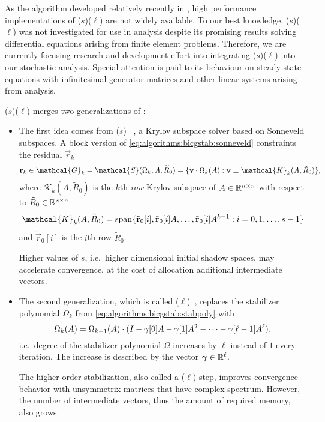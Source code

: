 As the algorithm developed relatively recently in
\citeyear{sleijpen2010exploiting}, high performance implementations of
($s$)($\ell$) are not widely available. To
our best knowledge, ($s$)($\ell$) was not
investigated for use in  analysis despite its promising
results solving differential equations arising from finite element
problems. Therefore, we are currently focusing research and
development effort into integrating
($s$)($\ell$) into our stochastic analysis.
Special attention is paid to its behaviour on steady-state equations
with infinitesimal generator matrices and other linear systems arising
from  analysis.

($s$)($\ell$) merges two generalizations of
:

\begin{itemize}
\item The first idea comes from ($s$)%
  ~\citep{sonneveld2008idr}, a Krylov subspace solver based on
  Sonneveld subspaces. A block version of
  \cref{eq:algorithms:bicgstab:sonneveld} constraints the residual
  $\vec{r}_k$
  \begin{equation}
    \vec{r}_k \in \mathcal{G}_k = \mathcal{S}(\Omega_k, A, \widetilde{R}_0) =
    \{ \vec{v} \cdot \Omega_k(A) : \vec{v} \perp \mathcal{K}_k(A,
    \tilde{R}_0) \}\text,
  \end{equation}
  where $\mathcal{K}_k(A, \tilde{R}_0)$ is the $k$th \emph{row} Krylov
  subspace of $A \in \mathbb{R}^{n \times n}$ with respect to
  $\tilde{R}_0 \in \mathbb{R}^{s \times n}$
  \begin{equation}
    \mathcal{K}_k(A, \widetilde{R}_0) = \Span \{ \tilde{\vec{r}}_0[i],
    \tilde{\vec{r}}_0[i] A, \ldots, \tilde{\vec{r}}_0[i] A^{k - 1} : i =
    0, 1, \ldots, s - 1 \}
  \end{equation}
  and $\tilde{\vec{r}}_0[i]$ is the $i$th row $\tilde{R}_0$.

  Higher values of $s$, i.e.~higher dimensional initial shadow spaces,
  may accelerate convergence, at the cost of allocation additional
  intermediate vectors.

\item The second generalization, which is called
  ($\ell$)~\citep{sleijpen1993bicgstab}, replaces the
  stabilizer polynomial $\Omega_k$ from
  \cref{eq:algorithms:bicgstab:stabpoly} with
  \begin{equation}
    \Omega_k(A) = \Omega_{k - 1}(A) \cdot (I - \gamma[0] A - \gamma[1] A^2
    - \cdots - \gamma[\ell - 1] A^{\ell}) \text,
  \end{equation}
  i.e.~degree of the stabilizer polynomial $\Omega$ increases by $\ell$
  instead of $1$ every iteration. The increase is described by the
  vector $\vecarrow{\gamma} \in \RR^\ell$.

  The higher-order stabilization, also called a ($\ell$)
  step, improves convergence behavior with unsymmetrix matrices that
  have complex spectrum. However, the number of intermediate vectors,
  thus the amount of required memory, also grows.
\end{itemize}

